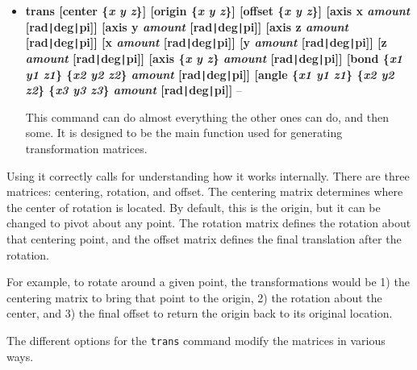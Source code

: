 \begin{itemize}
\item {\bf trans [center \{{\it x y z}\}] 
  [origin \{{\it x y z}\}] [offset \{{\it x y z}\}]
  [axis x {\it amount} [rad\verb!|!deg\verb!|!pi]]
  [axis y {\it amount} [rad\verb!|!deg\verb!|!pi]]
  [axis z {\it amount} [rad\verb!|!deg\verb!|!pi]]
  [x {\it amount} [rad\verb!|!deg\verb!|!pi]]
  [y {\it amount} [rad\verb!|!deg\verb!|!pi]]
  [z {\it amount} [rad\verb!|!deg\verb!|!pi]]
  [axis \{{\it x y z}\}  {\it amount} [rad\verb!|!deg\verb!|!pi]]
  [bond \{{\it x1 y1 z1}\} \{{\it x2 y2 z2}\} {\it amount} 
      [rad\verb!|!deg\verb!|!pi]]
  [angle \{{\it x1 y1 z1}\} \{{\it x2 y2 z2}\} \{{\it x3 y3 z3}\} 
      {\it amount} [rad\verb!|!deg\verb!|!pi]]} --

This command can do almost everything the other ones can do, and then
some.  It is designed to be the main function used for generating
transformation matrices.
\end{itemize}

Using it correctly calls for understanding how it works internally.
There are three matrices: centering, rotation, and offset.  The
centering matrix determines where the center of rotation is located.
By default, this is the origin, but it can be changed to pivot about
any point.  The rotation matrix defines the rotation about that
centering point, and the offset matrix defines the final translation
after the rotation.  

  For example, to rotate around a given point, the transformations
would be 1) the centering matrix to bring that point to the origin, 2)
the rotation about the center, and 3) the final offset to return the
origin back to its original location.

  The different options for the {\tt trans} command modify the
matrices in various ways.

